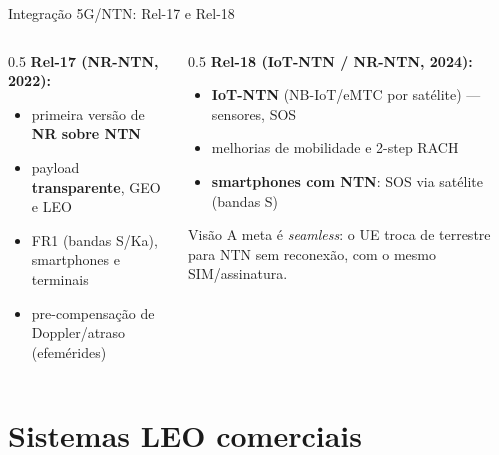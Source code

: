 \documentclass[aspectratio=169,11pt]{beamer}
\begin{document}
\begin{frame}{Integração 5G/NTN: Rel-17 e Rel-18}
  \begin{columns}
    \begin{column}{0.5\textwidth}
      \textbf{Rel-17 (NR-NTN, 2022):}
      \begin{itemize}
        \item primeira versão de \textbf{NR sobre NTN}
        \item payload \textbf{transparente}, GEO e LEO
        \item FR1 (bandas S/Ka), smartphones e terminais
        \item pre-compensação de Doppler/atraso (efemérides)
      \end{itemize}
    \end{column}
    \begin{column}{0.5\textwidth}
      \textbf{Rel-18 (IoT-NTN / NR-NTN, 2024):}
      \begin{itemize}
        \item \textbf{IoT-NTN} (NB-IoT/eMTC por satélite) --- sensores, SOS
        \item melhorias de mobilidade e 2-step RACH
        \item \textbf{smartphones com NTN}: SOS via satélite (bandas S)
      \end{itemize}
      \begin{exampleblock}{Visão}
        A meta é \emph{seamless}: o UE troca de terrestre para NTN sem reconexão, com o mesmo SIM/assinatura.
      \end{exampleblock}
    \end{column}
  \end{columns}
\end{frame}

\section{Sistemas LEO comerciais}
\end{document}
